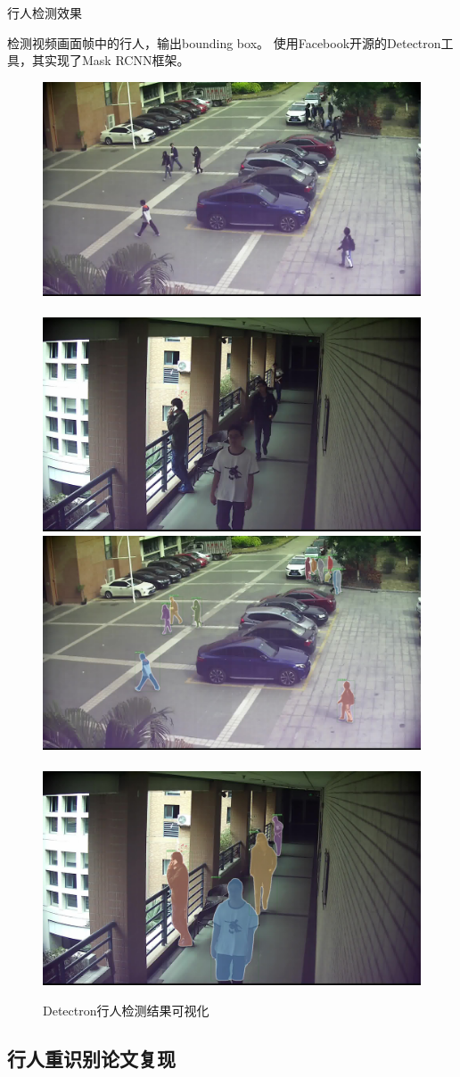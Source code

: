     \begin{frame}{行人检测效果}
    \begin{block}{}
    检测视频画面帧中的行人，输出bounding box。
    使用Facebook开源的Detectron工具，其实现了Mask RCNN框架。
    \end{block}
    \begin{figure}
    \centering
    \includegraphics[width=0.3\linewidth]{figures/1-2_5_151.jpg}~
    \includegraphics[width=0.3\linewidth]{figures/3-7_10_394.jpg}\\
    \includegraphics[width=0.3\linewidth]{figures/1-2_5_151_det.jpg}~
    \includegraphics[width=0.3\linewidth]{figures/3-7_10_394_det.jpg}
    \caption{Detectron行人检测结果可视化}
    \label{fig:detectron}
    \end{figure}
    \end{frame}

\subsection{行人重识别论文复现}

